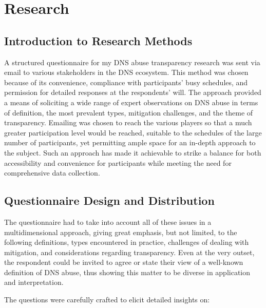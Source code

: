 \chapter{Research}

\section{Introduction to Research Methods} 

A structured questionnaire for my DNS abuse transparency research was sent via email to various stakeholders in the DNS ecosystem. This method was chosen because of its convenience, compliance with participants' busy schedules, and permission for detailed responses at the respondents' will. The approach provided a means of soliciting a wide range of expert observations on DNS abuse in terms of definition, the most prevalent types, mitigation challenges, and the theme of transparency. Emailing was chosen to reach the various players so that a much greater participation level would be reached, suitable to the schedules of the large number of participants, yet permitting ample space for an in-depth approach to the subject. Such an approach has made it achievable to strike a balance for both accessibility and convenience for participants while meeting the need for comprehensive data collection.



\section{Questionnaire Design and Distribution} 

The questionnaire had to take into account all of these issues in a multidimensional approach, giving great emphasis, but not limited, to the following definitions, types encountered in practice, challenges of dealing with mitigation, and considerations regarding transparency. Even at the very outset, the respondent could be invited to agree or state their view of a well-known definition of DNS abuse, thus showing this matter to be diverse in application and interpretation.

The questions were carefully crafted to elicit detailed insights on:

